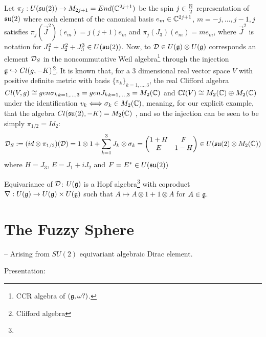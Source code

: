 Let $\pi_j: U(\mathfrak{su}(2)) \to M_{2j+1} = End(\mathbb{C}^{2j+1})$ be the spin $j \in \frac{\mathbb{N}}{2}$ representation of $\mathfrak{su}(2)$ where each element of the canonical basis $e_m \in \mathbb{C}^{2j+1}$, $m = -j, \dots, j-1, j$ satisfies $\pi_j(\vec J^2)(e_m) = j(j+1) e_m$ and $\pi_j(J_3)(e_m) = m e_m$, where $\vec J^2$ is notation for $J_1^2 + J_2^2 + J_3^3 \in U(\mathfrak{su}(2))$.
Now, to $\mathcal D \in U(\mathfrak{g}) \otimes U(\mathfrak{g})$ corresponds an element $\mathcal D_S$ in the noncommutative Weil algebra\footnote{CCR algebra of $(\mathfrak{g}, \omega?)$. } through the injection $\mathfrak{g} \hookrightarrow Cl(g, -K)$\footnote{Clifford algebra}. It is known that, for a $3$ dimensional real vector space $V$ with positive definite metric with basis $\{v_k\}_{k = 1, \dots, 3}$, the real Clifford algebra $Cl(V, g) \cong gen{\sigma_k}_{k = 1, \dots, 3} = gen{J_k}_{k = 1, \dots, 3} = M_2(\mathbb{C})$ and $\mathbb{C} l(V) \cong M_2(\mathbb{C}) \oplus M_2(\mathbb{C})$ under the identification $v_k \Longleftrightarrow \sigma_k \in M_2(\mathbb{C})$, meaning, for our explicit example, that the algebra $Cl(\mathfrak{su}(2), -K) = M_2(\mathbb{C})$ 
, and so the injection can be seen to be simply $\pi_{1/2} = Id_2$:
\begin{equation}
    \mathcal D_S := (id \otimes \pi_{1/2})(\mathcal D) = 1 \otimes 1 + \sum_{k = 1}^3 J_k \otimes \sigma_k = \begin{pmatrix} 1 + H & F \\ E & 1 - H \end{pmatrix} \in U(\mathfrak{su}(2)\otimes M_2(\mathbb{C}))
\end{equation}
where $H = J_3$, $E = J_1 + iJ_2$ and $F = E^* \in U(\mathfrak{su}(2))$


Equivariance of $\mathcal D$: $U(\mathfrak{g})$ is a Hopf algebra\footnote{} with coproduct $\nabla: U(\mathfrak{g}) \to U(\mathfrak{g}) \times U(\mathfrak{g})$ such that $A \mapsto A \otimes 1 + 1 \otimes A$ for $A \in \mathfrak{g}$.

\section{The Fuzzy Sphere}

\linea
-- Arising from $SU(2)$ equivariant algebraic Dirac element.

Presentation:

